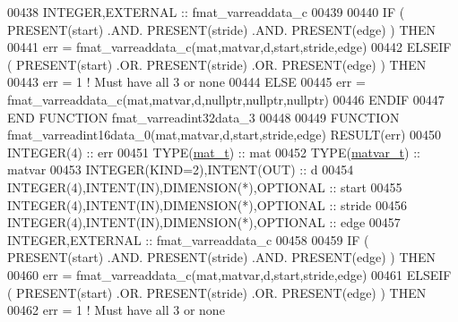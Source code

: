 \begin{DoxyCode}
00438     \textcolor{keywordtype}{INTEGER},\textcolor{keywordtype}{EXTERNAL}                             :: fmat\_varreaddata\_c
00439 
00440     \textcolor{keywordflow}{IF} ( \textcolor{keyword}{PRESENT}(start) .AND. \textcolor{keyword}{PRESENT}(stride) .AND. \textcolor{keyword}{PRESENT}(edge) ) \textcolor{keywordflow}{THEN}
00441         err = fmat\_varreaddata\_c(mat,matvar,d,start,stride,edge)
00442     \textcolor{keywordflow}{ELSEIF} ( \textcolor{keyword}{PRESENT}(start) .OR. \textcolor{keyword}{PRESENT}(stride) .OR. \textcolor{keyword}{PRESENT}(edge) ) \textcolor{keywordflow}{THEN}
00443         err = 1    \textcolor{comment}{! Must have all 3 or none}
00444     \textcolor{keywordflow}{ELSE}
00445         err = fmat\_varreaddata\_c(mat,matvar,d,nullptr,nullptr,nullptr)
00446 \textcolor{keywordflow}{    ENDIF}
00447 \textcolor{keyword}{END FUNCTION }fmat\_varreadint32data\_3
00448 
00449 \textcolor{keyword}{FUNCTION }fmat\_varreadint16data\_0(mat,matvar,d,start,stride,edge) \textcolor{keyword}{RESULT}(err)
00450     \textcolor{keywordtype}{INTEGER(4)}                                  :: err
00451     \textcolor{keywordtype}{TYPE}(\hyperlink{group___m_a_t_gab0fc888f5a5d79943b16284b1f91c2e8}{mat\_t})                                 :: mat
00452     \textcolor{keywordtype}{TYPE}(\hyperlink{group___m_a_t_structmatvar__t}{matvar\_t})                              :: matvar
00453     \textcolor{keywordtype}{INTEGER(KIND=2)},\textcolor{keywordtype}{INTENT(OUT)}                 :: d
00454     \textcolor{keywordtype}{INTEGER(4)},\textcolor{keywordtype}{INTENT(IN)},\textcolor{keywordtype}{DIMENSION(*)},\textcolor{keywordtype}{OPTIONAL} :: start
00455     \textcolor{keywordtype}{INTEGER(4)},\textcolor{keywordtype}{INTENT(IN)},\textcolor{keywordtype}{DIMENSION(*)},\textcolor{keywordtype}{OPTIONAL} :: stride
00456     \textcolor{keywordtype}{INTEGER(4)},\textcolor{keywordtype}{INTENT(IN)},\textcolor{keywordtype}{DIMENSION(*)},\textcolor{keywordtype}{OPTIONAL} :: edge
00457     \textcolor{keywordtype}{INTEGER},\textcolor{keywordtype}{EXTERNAL}                            :: fmat\_varreaddata\_c
00458 
00459     \textcolor{keywordflow}{IF} ( \textcolor{keyword}{PRESENT}(start) .AND. \textcolor{keyword}{PRESENT}(stride) .AND. \textcolor{keyword}{PRESENT}(edge) ) \textcolor{keywordflow}{THEN}
00460         err = fmat\_varreaddata\_c(mat,matvar,d,start,stride,edge)
00461     \textcolor{keywordflow}{ELSEIF} ( \textcolor{keyword}{PRESENT}(start) .OR. \textcolor{keyword}{PRESENT}(stride) .OR. \textcolor{keyword}{PRESENT}(edge) ) \textcolor{keywordflow}{THEN}
00462         err = 1    \textcolor{comment}{! Must have all 3 or none}

\end{DoxyCode}
